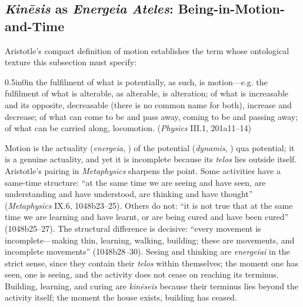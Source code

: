 \subsection{\textit{Kinēsis} as \textit{Energeia Ateles}: Being-in-Motion-and-Time}

Aristotle's compact definition of motion establishes the term whose ontological texture this subsection must specify:
\begin{adjustwidth}{0.5in}{0in}
the fulfilment of what is potentially, as such, is motion---e.g. the fulfilment of what is alterable, as alterable, is alteration; of what is increasable and its opposite, decreasable (there is no common name for both), increase and decrease; of what can come to be and pass away, coming to be and passing away; of what can be carried along, locomotion. (\textit{Physics} III.1, 201a11--14)
\end{adjustwidth}
Motion is the actuality (\textit{energeia}, ) of the potential (\textit{dynamis}, ) qua potential; it is a genuine actuality, and yet it is incomplete because its \textit{telos} lies outside itself. Aristotle's pairing in \textit{Metaphysics} sharpens the point. Some activities have a same-time structure: ``at the same time we are seeing and have seen, are understanding and have understood, are thinking and have thought'' (\textit{Metaphysics} IX.6, 1048b23--25). Others do not: ``it is not true that at the same time we are learning and have learnt, or are being cured and have been cured'' (1048b25--27). The structural difference is decisive: ``every movement is incomplete---making thin, learning, walking, building; these are movements, and incomplete movements'' (1048b28--30). Seeing and thinking are \textit{energeiai} in the strict sense, since they contain their \textit{telos} within themselves; the moment one has seen, one is seeing, and the activity does not cease on reaching its terminus. Building, learning, and curing are \textit{kinēseis} because their terminus lies beyond the activity itself; the moment the house exists, building has ceased.

